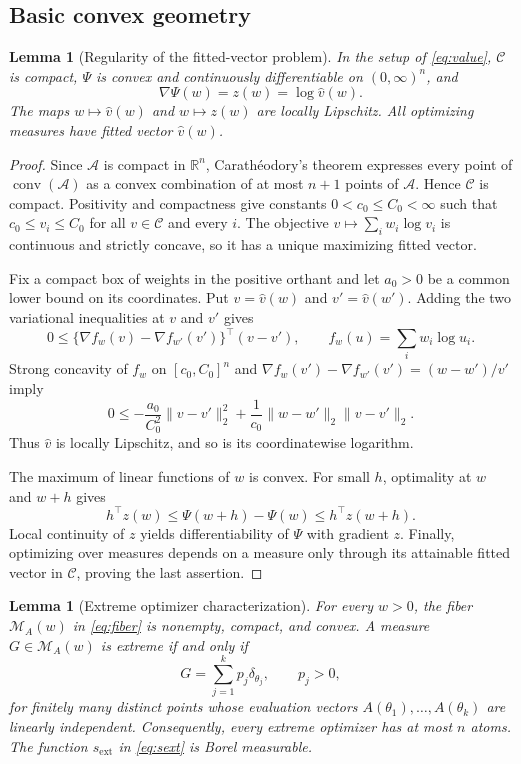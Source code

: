 \documentclass[11pt]{article}
\newtheorem{lemma}[theorem]{Lemma}
\theoremstyle{definition}
\theoremstyle{remark}
\DeclareMathOperator{\conv}{conv}
\newcommand{\Mcal}{\mathcal M}
\newcommand{\Ccal}{\mathcal C}
\newcommand{\Acal}{\mathcal A}
\newcommand{\RR}{\mathbb R}
\newcommand{\norm}[1]{\lVert #1\rVert}
\newcommand{\vhat}{\widehat v}
\begin{document}
\subsection{Basic convex geometry}

\begin{lemma}[Regularity of the fitted-vector problem]
\label{lem:regularity}
In the setup of \eqref{eq:value}, $\Ccal$ is compact,
$\Psi$ is convex and continuously differentiable on $(0,\infty)^n$, and
\[
 \nabla\Psi(w)=z(w)=\log\vhat(w).
\]
The maps $w\mapsto\vhat(w)$ and $w\mapsto z(w)$ are locally Lipschitz.
All optimizing measures have fitted vector $\vhat(w)$.
\end{lemma}

\begin{proof}
Since $\Acal$ is compact in $\RR^n$, Carath\'eodory's theorem expresses
every point of $\conv(\Acal)$ as a convex combination of at most $n+1$
points of $\Acal$.  Hence $\Ccal$ is compact.  Positivity and compactness give
constants $0<c_0\le C_0<\infty$ such that
$c_0\le v_i\le C_0$ for all $v\in\Ccal$ and every $i$.  The objective
$v\mapsto\sum_iw_i\log v_i$ is continuous and strictly concave, so it has a
unique maximizing fitted vector.

Fix a compact box of weights in the positive orthant and let $a_0>0$ be a
common lower bound on its coordinates.  Put
$v=\vhat(w)$ and $v'=\vhat(w')$.  Adding the two variational inequalities at
$v$ and $v'$ gives
\[
 0\le\{\nabla f_w(v)-\nabla f_{w'}(v')\}^\top(v-v'),
 \qquad f_w(u)=\sum_iw_i\log u_i.
\]
Strong concavity of $f_w$ on $[c_0,C_0]^n$ and
$\nabla f_w(v')-\nabla f_{w'}(v')=(w-w')/v'$ imply
\[
 0\le-\frac{a_0}{C_0^2}\norm{v-v'}_2^2
       +\frac1{c_0}\norm{w-w'}_2\norm{v-v'}_2.
\]
Thus $\vhat$ is locally Lipschitz, and so is its coordinatewise logarithm.

The maximum of linear functions of $w$ is convex.  For small $h$, optimality
at $w$ and $w+h$ gives
\[
 h^\top z(w)\le\Psi(w+h)-\Psi(w)\le h^\top z(w+h).
\]
Local continuity of $z$ yields differentiability of $\Psi$ with gradient
$z$.  Finally, optimizing over measures depends on a measure only through its
attainable fitted vector in $\Ccal$, proving the last assertion.
\end{proof}

\begin{lemma}[Extreme optimizer characterization]
\label{lem:extreme}
For every $w>0$, the fiber $\Mcal_A(w)$ in \eqref{eq:fiber} is nonempty,
compact, and convex.  A measure $G\in\Mcal_A(w)$ is extreme if and only if
\[
 G=\sum_{j=1}^kp_j\delta_{\theta_j},\qquad p_j>0,
\]
for finitely many distinct points whose evaluation vectors
$A(\theta_1),\ldots,A(\theta_k)$ are linearly independent.  Consequently,
every extreme optimizer has at most $n$ atoms.  The function
$s_{\mathrm{ext}}$ in \eqref{eq:sext} is Borel measurable.
\end{lemma}
\end{document}
